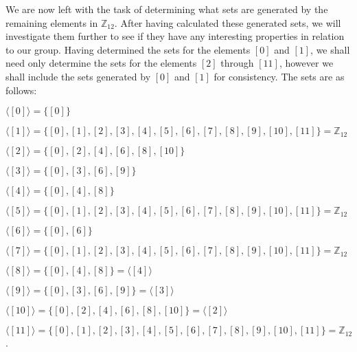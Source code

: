 \documentclass[12pt, a4paper]{article}
\begin{document}
    We are now left with the task of determining what sets are generated by the remaining elements in $\mathbb{Z}_{12}$. After having calculated these generated sets, we will investigate them further to see if they have any interesting properties in relation to our group. Having determined the sets for the elements $[0]$ and $[1]$, we shall need only determine the sets for the elements $[2]$ through $[11]$, however we shall include the sets generated by $[0]$ and $[1]$ for consistency. The sets are as follows:\par
    


\begin{description}

    \item $\langle [0]\rangle=\{[0]\}$
    
    \item $\langle [1]\rangle=\{[0],[1],[2],[3],[4],[5],[6],[7],[8],[9],[10],[11]\}=\mathbb{Z}_{12}$

    \item $\langle [2]\rangle=\{[0],[2],[4],[6],[8],[10]\}$
    
    \item $\langle [3]\rangle=\{[0],[3],[6],[9]\}$
    
    \item $\langle [4]\rangle=\{[0],[4],[8]\}$
    
    \item $\langle [5]\rangle=\{[0],[1],[2],[3],[4],[5],[6],[7],[8],[9],[10],[11]\}=\mathbb{Z}_{12}$
    
    \item $\langle [6]\rangle=\{[0],[6]\}$
    
    \item $\langle [7]\rangle=\{[0],[1],[2],[3],[4],[5],[6],[7],[8],[9],[10],[11]\}=\mathbb{Z}_{12}$
    
    \item $\langle [8]\rangle=\{[0],[4],[8]\}=\langle [4]\rangle$
    
    \item $\langle [9]\rangle=\{[0],[3],[6],[9]\}=\langle [3]\rangle$
    
    \item $\langle [10]\rangle=\{[0],[2],[4],[6],[8],[10]\}=\langle [2]\rangle$
    
    \item $\langle [11]\rangle=\{[0],[1],[2],[3],[4],[5],[6],[7],[8],[9],[10],[11]\}=\mathbb{Z}_{12}$.
    
\end{description}
\end{document}
